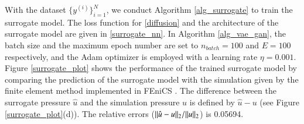 With the dataset $\{y^{(i)}\}_{i=1}^N$, we conduct Algorithm \ref{alg_surrogate} to train the surrogate model.  
The loss function for \eqref{diffusion} and the architecture of the surrogate model are given in \ref{surrogate_nn}. In Algorithm \ref{alg_vae_gan}, the batch size and 
the maximum epoch number
are set to $n_{batch}=100$ and  $E=100$ respectively, and the Adam optimizer is employed
 with a learning rate $\eta=0.001$. 
Figure \ref{surrogate_plot} shows the performance of the trained surrogate model by comparing the prediction of the surrogate model with the simulation given by the finite element method implemented in FEniCS \cite{langtangen2017solving}. 
The difference between the surrogate pressure $\hat{u}$ and the simulation pressure $u$ is defined by $\hat{u}-u$ (see Figure \ref{surrogate_plot}(d)). The relative errors ($\Arrowvert \hat{u}-u \Arrowvert_2/\Arrowvert u \Arrowvert_2$) is 0.05694.
